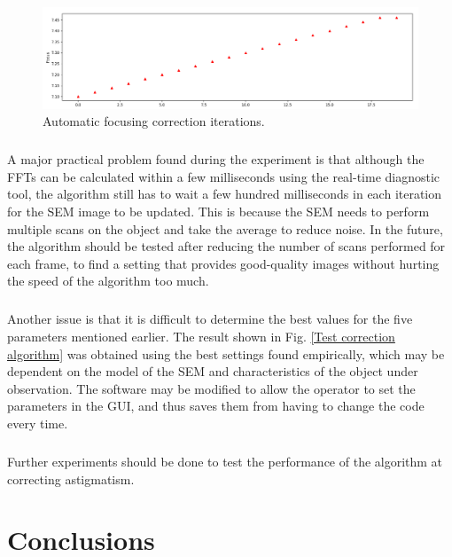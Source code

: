 \documentclass[12pt, twocolumn]{report}
\begin{document}
\begin{figure}[htbp]
    \centering
    \includegraphics[width=1\textwidth]{Figures/Test correction algorithm iterations.png}
    \caption{Automatic focusing correction iterations.}
    \label{Test correction algorithm iterations}
\end{figure}

\paragraph{}
A major practical problem found during the experiment is that although the FFTs can be calculated within a few milliseconds using the real-time diagnostic tool, the algorithm still has to wait a few hundred milliseconds in each iteration for the SEM image to be updated. This is because the SEM needs to perform multiple scans on the object and take the average to reduce noise. In the future, the algorithm should be tested after reducing the number of scans performed for each frame, to find a setting that provides good-quality images without hurting the speed of the algorithm too much.

\paragraph{}
Another issue is that it is difficult to determine the best values for the five parameters mentioned earlier. The result shown in Fig. \ref{Test correction algorithm} was obtained using the best settings found empirically, which may be dependent on the model of the SEM and characteristics of the object under observation. The software may be modified to allow the operator to set the parameters in the GUI, and thus saves them from having to change the code every time.

\paragraph{}
Further experiments should be done to test the performance of the algorithm at correcting astigmatism.

\chapter{Conclusions}
\end{document}
